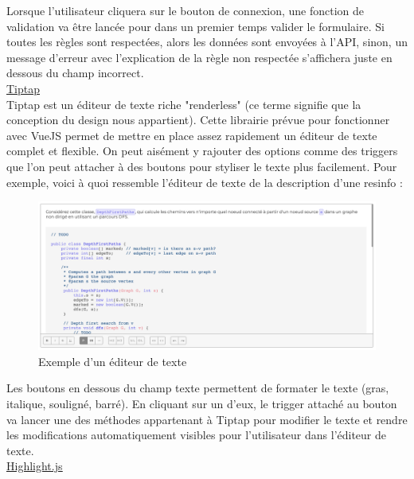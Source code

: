 Lorsque l'utilisateur cliquera sur le bouton de connexion, une fonction de validation va être lancée pour dans un premier temps valider le formulaire. Si toutes les règles sont respectées, alors les données sont envoyées à l'API, sinon, un message d'erreur avec l'explication de la règle non respectée s'affichera juste en dessous du champ incorrect.\\

\pagebreak
\noindent\underline{\href{https://tiptap.scrumpy.io}{Tiptap}}\\

Tiptap est un éditeur de texte riche "renderless" (ce terme signifie que la conception du design nous appartient). Cette librairie prévue pour fonctionner avec VueJS permet de mettre en place assez rapidement un éditeur de texte complet et flexible. On peut aisément y rajouter des options comme des triggers que l'on peut attacher à des boutons pour styliser le texte plus facilement. Pour exemple, voici à quoi ressemble l'éditeur de texte de la description d'une \gls{resinfo} :\\

\begin{figure}[H]
    \includegraphics[width=\textwidth,height=0.35\textheight,keepaspectratio]{images/libraries/tiptap.png}
    \centering
    \caption[Tiptap : Exemple d'utilisation]{Exemple d'un éditeur de texte}
\end{figure}

Les boutons en dessous du champ texte permettent de formater le texte (gras, italique, souligné, barré). En cliquant sur un d'eux, le trigger attaché au bouton va lancer une des méthodes appartenant à Tiptap pour modifier le texte et rendre les modifications automatiquement visibles pour l'utilisateur dans l'éditeur de texte.\\

\noindent\underline{\href{https://highlightjs.org}{Highlight.js}}\\

